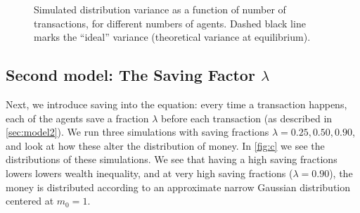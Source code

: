 \documentclass[12pt,a4paper]{article}
\begin{document}
\begin{figure}[!ht]
  \centering

  \caption{Simulated distribution variance as a function of number of transactions, for different numbers of agents. Dashed black line marks the ``ideal'' variance (theoretical variance at equilibrium).} \label{fig:a-equilibrium}
\end{figure}

\clearpage
\subsection{Second model: The Saving Factor $\lambda$}
Next, we introduce saving into the equation: every time a transaction happens, each of the agents save a fraction $\lambda$ before each transaction (as described in \cref{sec:model2}). We run three simulations with saving fractions $\lambda = 0.25, 0.50, 0.90$, and look at how these alter the distribution of money. In \cref{fig:c} we see the distributions of these simulations. We see that having a high saving fractions lowers lowers wealth inequality, and at very high saving fractions ($\lambda = 0.90$), the money is distributed according to an approximate narrow Gaussian distribution centered at $m_0 = 1$.
\end{document}

